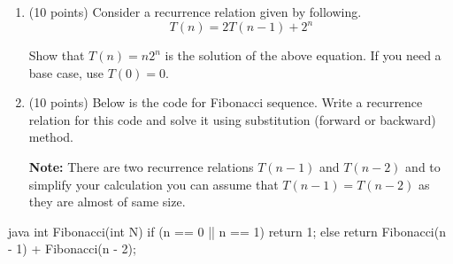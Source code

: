 \documentclass[12pt, a4paper]{article}
\begin{document}
\newpage



\begin{enumerate}[resume]

  \item (10 points) Consider a recurrence relation given by following.
  \begin{equation*}
    T(n) = 2T(n-1) + 2^n
  \end{equation*}
  
  Show that $T(n)=n2^n$ is the solution of the above equation.
  If you need a base case, use $T(0)=0$.



  \newpage



  \item (10 points) Below is the code for Fibonacci sequence. Write a recurrence relation for this code and solve it using substitution (forward or backward) method.
  
  \textbf{Note:} There are two recurrence relations $T(n-1)$ and $T(n-2)$ and to simplify your calculation you can assume that $T(n-1)=T(n-2)$ as they are almost of same size.

\end{enumerate}

\begin{MintedUnbreakableCodeBlock}{java}
      int Fibonacci(int N) {
        if (n == 0 || n == 1) {
          return 1;
        }
        else {
          return Fibonacci(n - 1) + Fibonacci(n - 2);
        }
      }
\end{MintedUnbreakableCodeBlock}
\end{document}
